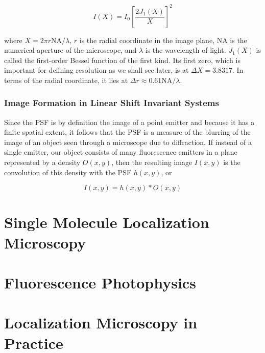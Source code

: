 \documentclass[10pt,a4paper]{book}
\begin{document}
\begin{equation}
    I \left(X\right) = I_{0} \left[ \frac{2 J_{1}\left(X\right)}{X} \right]^2
\end{equation}

\noindent where $ X = 2 \pi r \text{NA} / \lambda $, $r$ is the radial coordinate in the image plane, $\text{NA}$ is the numerical aperture of the microscope, and $\lambda$ is the wavelength of light. $J_{1}\left(X\right)$ is called the first-order Bessel function of the first kind. Its first zero, which is important for defining resolution as we shall see later, is at $\Delta X = 3.8317$. In terms of the radial coordinate, it lies at $\Delta r \approx 0.61 \text{NA} / \lambda$.

\subsection{Image Formation in Linear Shift Invariant Systems}

Since the PSF is by definition the image of a point emitter and because it has a finite spatial extent, it follows that the PSF is a measure of the blurring of the image of an object seen through a microscope due to diffraction. If instead of a single emitter, our object consists of many fluorescence emitters in a plane represented by a density $O \left(x, y\right)$, then the resulting image $I \left(x, y\right)$ is the convolution of this density with the PSF $h \left(x, y\right)$, or

\begin{equation}
    I \left(x, y\right) = h \left(x, y\right) \ast O \left(x, y\right)
\end{equation}



\chapter{Single Molecule Localization Microscopy}

\chapter{Fluorescence Photophysics}

\chapter{Localization Microscopy in Practice}
\end{document}
